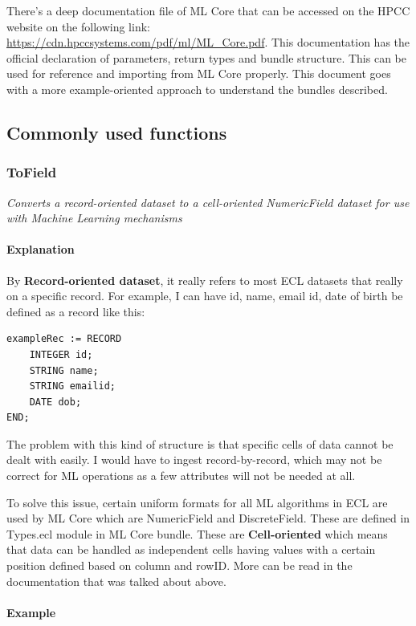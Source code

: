 \documentclass[a4paper,oneside,12pt]{book}
\begin{document}
There's a deep documentation file of ML Core that can be accessed on the HPCC website on the following link: \url{https://cdn.hpccsystems.com/pdf/ml/ML\_Core.pdf}. This documentation has the official declaration of parameters, return types and bundle structure. This can be used for reference and importing from ML Core properly. This document goes with a more example-oriented approach to understand the bundles described.

\subsection{Commonly used functions}

\subsubsection{ToField}\label{mlcore:tofield}

\textit{Converts a record-oriented dataset to a cell-oriented NumericField dataset for use with Machine Learning mechanisms}

\paragraph{Explanation}

By \textbf{Record-oriented dataset}, it really refers to most ECL datasets that really on a specific record. For example, I can have id, name, email id, date of birth be defined as a record like this:

\begin{lstlisting}
exampleRec := RECORD
    INTEGER id;
    STRING name;
    STRING emailid;
    DATE dob;
END;
\end{lstlisting}

The problem with this kind of structure is that specific cells of data cannot be dealt with easily. I would have to ingest record-by-record, which may not be correct for ML operations as a few attributes will not be needed at all.

To solve this issue, certain uniform formats for all ML algorithms in ECL are used by ML Core which are NumericField and DiscreteField. These are defined in Types.ecl module in ML Core bundle. These are \textbf{Cell-oriented} which means that data can be handled as independent cells having values with a certain position defined based on column and rowID. More can be read in the documentation that was talked about above.

\paragraph{Example}
\end{document}
